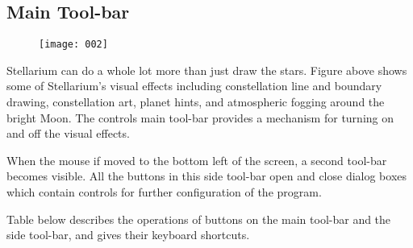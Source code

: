\subsection{Main Tool-bar}

\begin{figure}[h]
\centering\texttt{[image: 002]}
\end{figure}

Stellarium can do a whole lot more than just draw the stars. Figure
above shows some of Stellarium's visual effects including constellation
line and boundary drawing, constellation art, planet hints, and
atmospheric fogging around the bright Moon. The controls main tool-bar
provides a mechanism for turning on and off the visual effects.

When the mouse if moved to the bottom left of the screen, a second
tool-bar becomes visible. All the buttons in this side tool-bar open and
close dialog boxes which contain controls for further configuration of
the program.

Table below describes the operations of buttons on the main tool-bar and
the side tool-bar, and gives their keyboard shortcuts.

